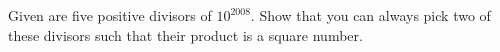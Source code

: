 Given are five positive divisors of $10^{2008}$.
Show that you can always pick two of these divisors such that their product is a square number.